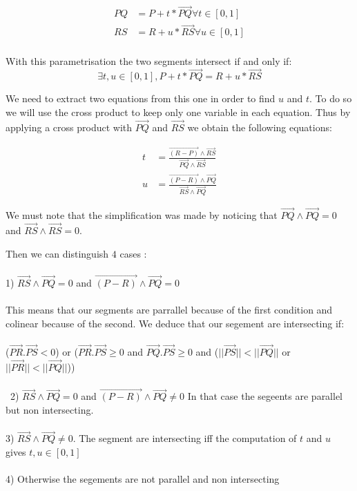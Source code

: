 \documentclass[12pt, a4paper]{report} %
\begin{document}
\begin{align}
	PQ &= P + t*\overrightarrow{PQ} \forall t \in [0,1]\\
	RS &= R + u*\overrightarrow{RS} \forall u \in [0,1]\\
\end{align}

With this parametrisation the two segments intersect if and only if:\\
\begin{equation}
\exists t,u \in [0,1], P + t*\overrightarrow{PQ} = R + u*\overrightarrow{RS}
\end{equation}


We need to extract two equations from this one in order to find $u$ and $t$.
To do so we will use the cross product to keep only one variable in each equation. Thus by applying a cross product with $\overrightarrow{PQ}$ and $\overrightarrow{RS}$ we obtain the following equations:

\begin{align}
	t &= \frac{\overrightarrow{(R - P)} \wedge \overrightarrow{RS}}{\overrightarrow{PQ} \wedge \overrightarrow{RS}}\\
	u &= \frac{\overrightarrow{(P - R)} \wedge \overrightarrow{PQ}}{\overrightarrow{RS} \wedge \overrightarrow{PQ}}
\end{align}

We must note that the simplification was made by noticing that $\overrightarrow{PQ} \wedge \overrightarrow{PQ} = 0$ and $\overrightarrow{RS} \wedge \overrightarrow{RS} = 0$.

Then we can distinguish $4$ cases :\\\\
1) $ \overrightarrow{RS} \wedge \overrightarrow{PQ} = 0$ and $\overrightarrow{(P - R)} \wedge \overrightarrow{PQ} = 0$\\\\
This means that our segments are parrallel because of the first condition and colinear because of the second. We deduce that our segement are intersecting if: \\\\ 
($\overrightarrow{PR}.\overrightarrow{PS} < 0$) or ($\overrightarrow{PR}.\overrightarrow{PS} \geq 0$ and $\overrightarrow{PQ}.\overrightarrow{PS} \geq 0$ and ($||\overrightarrow{PS}|| < ||\overrightarrow{PQ}||$ or $||\overrightarrow{PR}|| < ||\overrightarrow{PQ}||$))
\\\\\
2)  $ \overrightarrow{RS} \wedge \overrightarrow{PQ} = 0$ and $\overrightarrow{(P - R)} \wedge \overrightarrow{PQ} \neq 0$
In that case the segeents are parallel but non intersecting.\\\\
3)  $ \overrightarrow{RS} \wedge \overrightarrow{PQ} \neq 0$.
The segment are intersecting iff the computation of $t$ and $u$ gives $t,u \in [0,1]$\\\\
4) Otherwise the segements are not parallel and non intersecting\\\\




\end{document}
